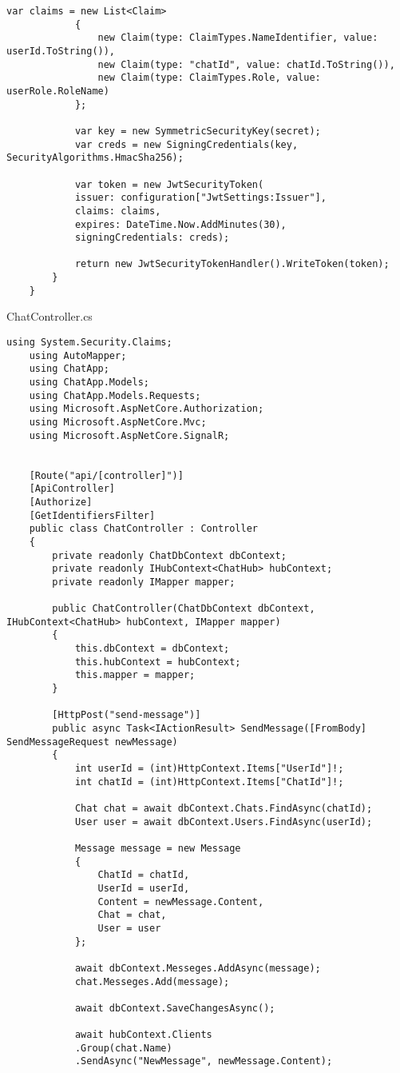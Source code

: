 \begin{lstlisting}[style=c#]
			var claims = new List<Claim>
			{
				new Claim(type: ClaimTypes.NameIdentifier, value: userId.ToString()),
				new Claim(type: "chatId", value: chatId.ToString()),
				new Claim(type: ClaimTypes.Role, value: userRole.RoleName)
			};
			
			var key = new SymmetricSecurityKey(secret);
			var creds = new SigningCredentials(key, SecurityAlgorithms.HmacSha256);
			
			var token = new JwtSecurityToken(
			issuer: configuration["JwtSettings:Issuer"],
			claims: claims,
			expires: DateTime.Now.AddMinutes(30),
			signingCredentials: creds);
			
			return new JwtSecurityTokenHandler().WriteToken(token);
		}
	}
\end{lstlisting}

ChatController.cs
\begin{lstlisting}[style=c#]
	using System.Security.Claims;
	using AutoMapper;
	using ChatApp;
	using ChatApp.Models;
	using ChatApp.Models.Requests;
	using Microsoft.AspNetCore.Authorization;
	using Microsoft.AspNetCore.Mvc;
	using Microsoft.AspNetCore.SignalR;
	
	
	[Route("api/[controller]")]
	[ApiController]
	[Authorize]
	[GetIdentifiersFilter]
	public class ChatController : Controller
	{
		private readonly ChatDbContext dbContext;
		private readonly IHubContext<ChatHub> hubContext;
		private readonly IMapper mapper;
		
		public ChatController(ChatDbContext dbContext, IHubContext<ChatHub> hubContext, IMapper mapper)
		{
			this.dbContext = dbContext;
			this.hubContext = hubContext;
			this.mapper = mapper;
		}
		
		[HttpPost("send-message")]
		public async Task<IActionResult> SendMessage([FromBody] SendMessageRequest newMessage)
		{
			int userId = (int)HttpContext.Items["UserId"]!;
			int chatId = (int)HttpContext.Items["ChatId"]!;
			
			Chat chat = await dbContext.Chats.FindAsync(chatId);
			User user = await dbContext.Users.FindAsync(userId);
			
			Message message = new Message
			{
				ChatId = chatId,
				UserId = userId,
				Content = newMessage.Content,
				Chat = chat,
				User = user
			};
			
			await dbContext.Messeges.AddAsync(message);
			chat.Messeges.Add(message);
			
			await dbContext.SaveChangesAsync();
			
			await hubContext.Clients
			.Group(chat.Name)
			.SendAsync("NewMessage", newMessage.Content);
			

\end{lstlisting}
